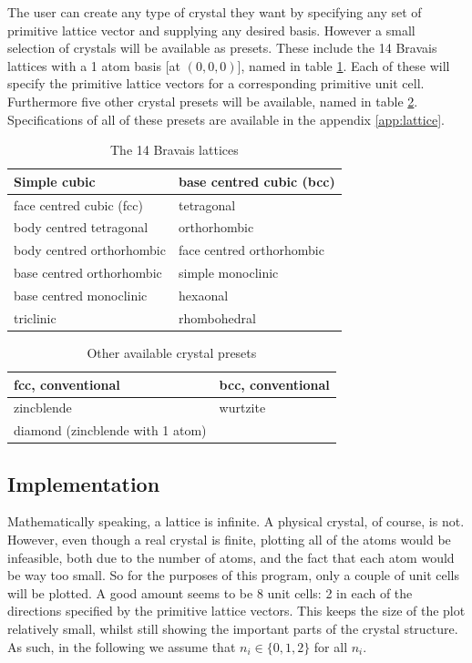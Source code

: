 \documentclass[main.tex]{subfiles}
\begin{document}
	The user can create any type of crystal they want by specifying any set of primitive lattice vector and supplying any desired basis. However a small selection of crystals will be available as presets. These include the 14 Bravais lattices with a 1 atom basis [at $ (0,0,0) $], named in table \ref{tab:bravais}. Each of these will specify the primitive lattice vectors for a corresponding primitive unit cell. Furthermore five other crystal presets will be available, named in table \ref{tab:presets}. Specifications of all of these presets are available in the appendix \ref{app:lattice}.
	\begin{table}[H]
		\centering
		\begin{tabular}{|l|l|}
			\hline
			Simple cubic & base centred cubic (bcc) \\
			\hline
			face centred cubic (fcc) & tetragonal \\
			\hline
			body centred tetragonal & orthorhombic \\
			\hline
			body centred orthorhombic & face centred orthorhombic \\
			\hline
			base centred orthorhombic & simple monoclinic \\
			\hline
			base centred monoclinic & hexaonal \\
			\hline
			triclinic & rhombohedral \\
			\hline
		\end{tabular}
		\caption{The 14 Bravais lattices}
		\label{tab:bravais}
	\end{table}
	\begin{table}[H]
		\centering
		\begin{tabular}{|l|l|}
			\hline
			fcc, conventional & bcc, conventional \\
			\hline
			zincblende & wurtzite \\
			\hline
			diamond (zincblende with 1 atom) & \\
			\hline
		\end{tabular}
		\caption{Other available crystal presets}
		\label{tab:presets}
	\end{table}
	
	\subsection{Implementation}	
	Mathematically speaking, a lattice is infinite. A physical crystal, of course, is not. However, even though a real crystal is finite, plotting all of the atoms would be infeasible, both due to the number of atoms, and the fact that each atom would be way too small. So for the purposes of this program, only a couple of unit cells will be plotted. A good amount seems to be 8 unit cells: 2 in each of the directions specified by the primitive lattice vectors. This keeps the size of the plot relatively small, whilst still showing the important parts of the crystal structure. As such, in the following we assume that $ n_i \in \{0, 1, 2\} $ for all $ n_i $.
	
\end{document}
